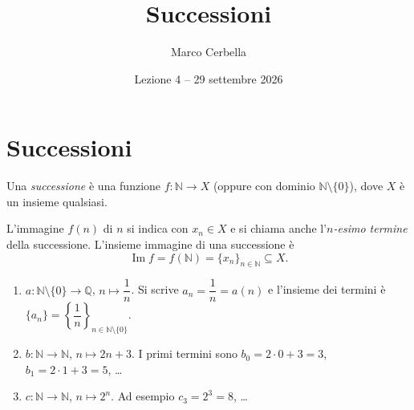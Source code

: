 \documentclass[11pt,a4paper]{article}
\title{Successioni}
\author{Marco Cerbella}
\date{Lezione 4 -- 29 settembre 2026}
\begin{document}
\maketitle

\section{Successioni}

\begin{definizione}
Una \emph{successione} è una funzione $f : \mathbb{N} \to X$ (oppure con
dominio $\mathbb{N} \setminus \{0\}$), dove $X$ è un insieme qualsiasi.
\end{definizione}

L'immagine $f(n)$ di $n$ si indica con $x_n \in X$ e si chiama anche
l'\emph{$n$-esimo termine} della successione. L'insieme immagine di una
successione è
\[
\operatorname{Im} f = f(\mathbb{N}) = \{x_n\}_{n \in \mathbb{N}}
\subseteq X.
\]

\begin{esempio}
\leavevmode
\begin{enumerate}
    \item $a : \mathbb{N} \setminus \{0\} \to \mathbb{Q}$,
          $n \mapsto \dfrac{1}{n}$. Si scrive $a_n = \dfrac{1}{n} = a(n)$
          e l'insieme dei termini è
          $\{a_n\} = \left\{\dfrac{1}{n}\right\}_{n \in \mathbb{N}
          \setminus \{0\}}$.

    \item $b : \mathbb{N} \to \mathbb{N}$, $n \mapsto 2n + 3$. I primi
          termini sono $b_0 = 2 \cdot 0 + 3 = 3$,
          $b_1 = 2 \cdot 1 + 3 = 5$, \dots

    \item $c : \mathbb{N} \to \mathbb{N}$, $n \mapsto 2^n$. Ad esempio
          $c_3 = 2^3 = 8$, \dots
\end{enumerate}
\end{esempio}
\end{document}
